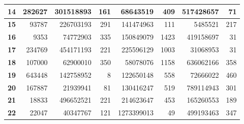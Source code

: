 \documentclass[12pt]{article}
\begin{document}
\begin{table}[!htbp]
{\begin{tabular}{crrrrrrr}
\multicolumn{1}{|c|}{\textbf{14}} & \multicolumn{1}{r|}{282627} & \multicolumn{1}{r|}{301518893} & \multicolumn{1}{r|}{161} & \multicolumn{1}{r|}{68643519} & \multicolumn{1}{r|}{409} & \multicolumn{1}{r|}{517428657} & \multicolumn{1}{r|}{71} \\ \hline
\multicolumn{1}{|c|}{\textbf{15}} & \multicolumn{1}{r|}{93787} & \multicolumn{1}{r|}{226703193} & \multicolumn{1}{r|}{291} & \multicolumn{1}{r|}{141474963} & \multicolumn{1}{r|}{111} & \multicolumn{1}{r|}{5485521} & \multicolumn{1}{r|}{217} \\ \hline
\multicolumn{1}{|c|}{\textbf{16}} & \multicolumn{1}{r|}{9353} & \multicolumn{1}{r|}{74772903} & \multicolumn{1}{r|}{335} & \multicolumn{1}{r|}{150849079} & \multicolumn{1}{r|}{1423} & \multicolumn{1}{r|}{419158697} & \multicolumn{1}{r|}{31} \\ \hline
\multicolumn{1}{|c|}{\textbf{17}} & \multicolumn{1}{r|}{234769} & \multicolumn{1}{r|}{454171193} & \multicolumn{1}{r|}{221} & \multicolumn{1}{r|}{225596129} & \multicolumn{1}{r|}{1003} & \multicolumn{1}{r|}{31068953} & \multicolumn{1}{r|}{31} \\ \hline
\multicolumn{1}{|c|}{\textbf{18}} & \multicolumn{1}{r|}{107000} & \multicolumn{1}{r|}{62900010} & \multicolumn{1}{r|}{350} & \multicolumn{1}{r|}{58078076} & \multicolumn{1}{r|}{1158} & \multicolumn{1}{r|}{636062166} & \multicolumn{1}{r|}{358} \\ \hline
\multicolumn{1}{|c|}{\textbf{19}} & \multicolumn{1}{r|}{643448} & \multicolumn{1}{r|}{142758952} & \multicolumn{1}{r|}{8} & \multicolumn{1}{r|}{122650148} & \multicolumn{1}{r|}{558} & \multicolumn{1}{r|}{72666022} & \multicolumn{1}{r|}{460} \\ \hline
\multicolumn{1}{|c|}{\textbf{20}} & \multicolumn{1}{r|}{167887} & \multicolumn{1}{r|}{21939941} & \multicolumn{1}{r|}{81} & \multicolumn{1}{r|}{130416247} & \multicolumn{1}{r|}{519} & \multicolumn{1}{r|}{789114943} & \multicolumn{1}{r|}{301} \\ \hline
\multicolumn{1}{|c|}{\textbf{21}} & \multicolumn{1}{r|}{18833} & \multicolumn{1}{r|}{496652521} & \multicolumn{1}{r|}{221} & \multicolumn{1}{r|}{214623647} & \multicolumn{1}{r|}{453} & \multicolumn{1}{r|}{165260553} & \multicolumn{1}{r|}{189} \\ \hline
\multicolumn{1}{|c|}{\textbf{22}} & \multicolumn{1}{r|}{22047} & \multicolumn{1}{r|}{40347767} & \multicolumn{1}{r|}{121} & \multicolumn{1}{r|}{1273399013} & \multicolumn{1}{r|}{49} & \multicolumn{1}{r|}{499193463} & \multicolumn{1}{r|}{347} \\ \hline

\end{tabular}}
\end{table}
\end{document}
